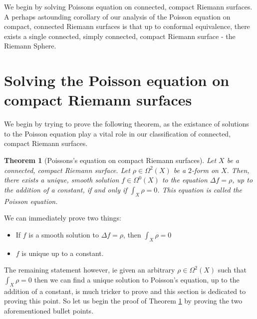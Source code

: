 \documentclass[11pt]{report}
\newtheorem{thm}{Theorem}[section]
\theoremstyle{definition}
\begin{document}
We begin by solving Poissons equation on connected, compact Riemann surfaces. A perhaps astounding corollary of our analysis of the Poisson equation on compact, connected Riemann surfaces is that up to conformal equivalence, there exists a single connected, simply connected, compact Riemann surface - the Riemann Sphere. 

\section{Solving the Poisson equation on compact Riemann surfaces}
We begin by trying to prove the following theorem, as the existance of solutions to the Poisson equation play a vital role in our classification of connected, compact Riemann surfaces.
\begin{thm}[Poissons's equation on compact Riemann surfaces]\label{compactPoisson}
  Let $X$ be a connected, compact Riemann surface. Let $\rho \in \Omega^2(X)$ be a $2$-form on $X$. Then, there exists a unique, smooth solution $f \in \Omega^0(X)$ to the equation $\Delta f = \rho$, up to the addition of a constant, if and only if $\int_X \rho = 0$. This equation is called the Poisson equation.
\end{thm}
We can immediately prove two things:
\begin{itemize}
  \item If $f$ is a smooth solution to $\Delta f = \rho$, then $\int_X \rho= 0$
  \item $f$ is unique up to a constant.
\end{itemize}
The remaining statement however, ie given an arbitrary $\rho \in \Omega^2(X)$ such that $\int_X \rho = 0$ then we can find a unique solution to Poisson's equation, up to the addition of a constant, is much tricker to prove and this section is dedicated to proving this point. So let us begin the proof of Theorem \ref{compactPoisson} by proving the two aforementioned bullet points.
\end{document}
